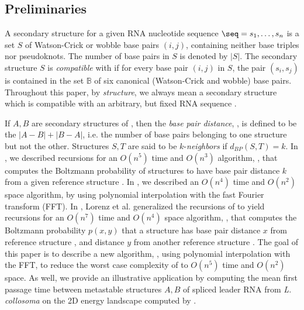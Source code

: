 \subsection{Preliminaries}


A secondary structure for a given RNA nucleotide sequence
$\seq = s_1,\dots,s_n$ is a set $S$ of Watson-Crick or wobble
base pairs $(i,j)$, containing neither base triples nor pseudoknots.
The number of base pairs in $S$ is denoted by $|S|$.
The secondary structure $S$ is {\em compatible}
with \seq if for every base pair $(i,j)$ in $S$, the pair
$(s_i,s_j)$ is contained in the set
$\mathbb{B}$
of six canonical (Watson-Crick and wobble) base pairs.
Throughout this paper, by {\em structure}, we always mean a
secondary structure which is compatible with an arbitrary, but fixed
RNA sequence \seq.

If $A,B$ are secondary structures of \seq, then the {\em base pair distance},
\dBP{\strA}{\strB}, is defined to be the $|A-B|+|B-A|$, i.e. the number of
base pairs belonging to one structure but not the other.
Structures $S,T$ are said to be $k$-{\em neighbors} if $d_{BP}(S,T) = k$.
In \citep{Freyhult.b07}, we described recursions for an $O(n^5)$ time and
$O(n^3)$ algorithm, \rnabor, that computes the Boltzmann probability
\pk of structures to have base pair distance $k$ from a given reference
structure \strA. In \citep{fftbor}, we described an $O(n^4)$ time and
$O(n^2)$ space algorithm, by using polynomial interpolation with the
fast Fourier transform (FFT).
In \citep{hofacker:RNAbor2D}, Lorenz et al. generalized
the recursions  of \rnabor \citep{Freyhult.b07}
to yield recursions for an $O(n^7)$ time and $O(n^4)$ space
algorithm, \rnatwofold,
that computes the Boltzmann probability $p(x,y)$ that a structure has
base pair distance $x$ from reference structure \strA, and distance
$y$ from another reference structure \strB.
The goal of this paper is to describe a new algorithm, \ffttwo,
using polynomial interpolation with the FFT, to
reduce the worst case complexity of \rnatwofold to
$O(n^5)$ time and $O(n^2)$ space. As well, we provide an
illustrative application by computing the mean first passage time
between metastable structures $A,B$ of spliced leader RNA from
{\em L. collosoma} on the 2D energy landscape computed by \ffttwo.

